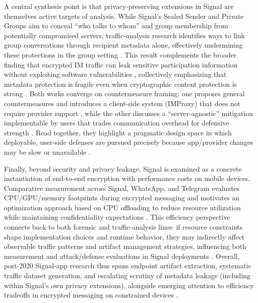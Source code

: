 A central synthesis point is that privacy-preserving extensions in Signal are themselves active targets of analysis. While Signal’s Sealed Sender and Private Groups aim to conceal “who talks to whom” and group membership from potentially compromised servers, traffic-analysis research identifies ways to link group conversations through recipient metadata alone, effectively undermining these protections in the group setting \cite{brigham2025}. This result complements the broader finding that encrypted IM traffic can leak sensitive participation information without exploiting software vulnerabilities \cite{bozorgi2023}, collectively emphasizing that metadata protection is fragile even when cryptographic content protection is strong \cite{bozorgi2023,brigham2025}. Both works converge on countermeasure framing: one proposes general countermeasures and introduces a client-side system (IMProxy) that does not require provider support \cite{bozorgi2023}, while the other discusses a “server-agnostic” mitigation implementable by users that trades communication overhead for defensive strength \cite{brigham2025}. Read together, they highlight a pragmatic design space in which deployable, user-side defenses are pursued precisely because app/provider changes may be slow or unavailable \cite{bozorgi2023,brigham2025}.

Finally, beyond security and privacy leakage, Signal is examined as a concrete instantiation of end-to-end encryption with performance costs on mobile devices. Comparative measurement across Signal, WhatsApp, and Telegram evaluates CPU/GPU/memory footprints during encrypted messaging and motivates an optimization approach based on CPU offloading to reduce resource utilization while maintaining confidentiality expectations \cite{thapa2025}. This efficiency perspective connects back to both forensic and traffic-analysis lines: if resource constraints shape implementation choices and runtime behavior, they may indirectly affect observable traffic patterns and artifact management strategies, influencing both measurement and attack/defense evaluations in Signal deployments \cite{thapa2025,erdenebaatar2023,bozorgi2023}. Overall, post-2020 Signal-app research thus spans endpoint artifact extraction, systematic traffic dataset generation, and escalating scrutiny of metadata leakage (including within Signal’s own privacy extensions), alongside emerging attention to efficiency tradeoffs in encrypted messaging on constrained devices \cite{krishnapriya2021,erdenebaatar2023,bozorgi2023,brigham2025,thapa2025}.

